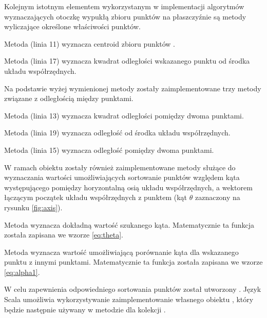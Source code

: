    		
   		Kolejnym istotnym elementem wykorzystanym w implementacji algorytmów wyznaczających otoczkę wypukłą zbioru punktów na płaszczyźnie są metody wyliczające określone właściwości punktów.
   		
   		Metoda  (linia 11) wyznacza centroid zbioru punktów .
   		
   		Metoda  (linia 17) wyznacza kwadrat odległości wskazanego punktu od środka układu współrzędnych.
   		
   		Na podstawie wyżej wymienionej metody zostały zaimplementowane trzy metody związane z odległością między punktami.
   		
   		Metoda  (linia 13) wyznacza kwadrat odległości pomiędzy dwoma punktami.
   		
   		Metoda  (linia 19) wyznacza odległość od środka układu współrzędnych.
   		
   		Metoda  (linia 15) wyznacza odległość pomiędzy dwoma punktami.

		W ramach obiektu  zostały również zaimplementowane metody służące do wyznaczania wartości umożliwiających sortowanie punktów względem kąta występującego pomiędzy horyzontalną osią układu współrzędnych, a wektorem łączącym początek układu współrzędnych z punktem (kąt $\theta$ zaznaczony na rysunku \ref{fig:axis}).
		
		Metoda  wyznacza dokładną wartość szukanego kąta. Matematycznie ta funkcja została zapisana we wzorze \ref{eq:theta}.
		
		Metoda  wyznacza wartość umożliwiającą porównanie kąta dla wskazanego punktu z innymi punktami. Matematycznie ta funkcja została zapisana we wzorze \ref{eq:alpha1}.
   		
   		
   		\newpage
   		
   		W celu zapewnienia odpowiedniego sortowania punktów został utworzony . Język Scala umożliwia wykorzystywanie zaimplementowanie własnego obiektu , który będzie następnie używany w metodzie  dla kolekcji .
   		
